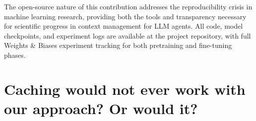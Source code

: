 The open-source nature of this contribution addresses the reproducibility crisis in machine learning research, providing both the tools and transparency necessary for scientific progress in context management for LLM agents. All code, model checkpoints, and experiment logs are available at the project repository, with full Weights \& Biases experiment tracking for both pretraining and fine-tuning phases.


\section{Caching would not ever work with our approach? Or would it?}